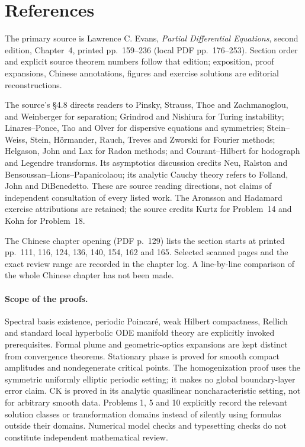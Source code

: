 \Needspace{65mm}
\section{References}\label{sec:4-8}
The primary source is Lawrence C. Evans, \emph{Partial Differential
Equations}, second edition, Chapter~4, printed pp.~159--236
(local PDF pp.~176--253).
Section order and explicit source theorem numbers follow that edition;
exposition, proof expansions, Chinese annotations, figures and
exercise solutions are editorial reconstructions.

The source's \S4.8 directs readers to Pinsky, Strauss,
Thoe and Zachmanoglou, and Weinberger for separation;
Grindrod and Nishiura for Turing instability;
Linares--Ponce, Tao and Olver for dispersive equations and symmetries;
Stein--Weiss, Stein, H\"ormander, Rauch, Treves and Zworski for Fourier
methods; Helgason, John and Lax for Radon methods;
and Courant--Hilbert for hodograph and Legendre transforms.
Its asymptotics discussion credits Neu, Ralston and
Bensoussan--Lions--Papanicolaou; its analytic Cauchy theory refers to
Folland, John and DiBenedetto.
These are source reading directions, not claims of independent
consultation of every listed work.
The Aronsson and Hadamard exercise attributions are retained;
the source credits Kurtz for Problem~14 and Kohn for Problem~18.

The Chinese chapter opening (PDF p.~129) lists the section starts
at printed pp.~111, 116, 124, 136, 140, 154, 162 and 165.
Selected scanned pages and the exact review range are recorded
in the chapter log. A line-by-line comparison of the whole Chinese
chapter has not been made.

\paragraph{Scope of the proofs.}
Spectral basis existence, periodic Poincar\'e, weak Hilbert compactness,
Rellich and standard local hyperbolic ODE manifold theory are explicitly
invoked prerequisites. Formal plume and geometric-optics expansions
are kept distinct from convergence theorems.
Stationary phase is proved for smooth compact amplitudes and
nondegenerate critical points. The homogenization proof uses the
symmetric uniformly elliptic periodic setting; it makes no global
boundary-layer error claim. CK is proved in its analytic quasilinear
noncharacteristic setting, not for arbitrary smooth data.
Problems 1, 5 and 10 explicitly record the relevant solution classes
or transformation domains instead of silently using formulas outside
their domains.
Numerical model checks and typesetting checks do not constitute
independent mathematical review.
